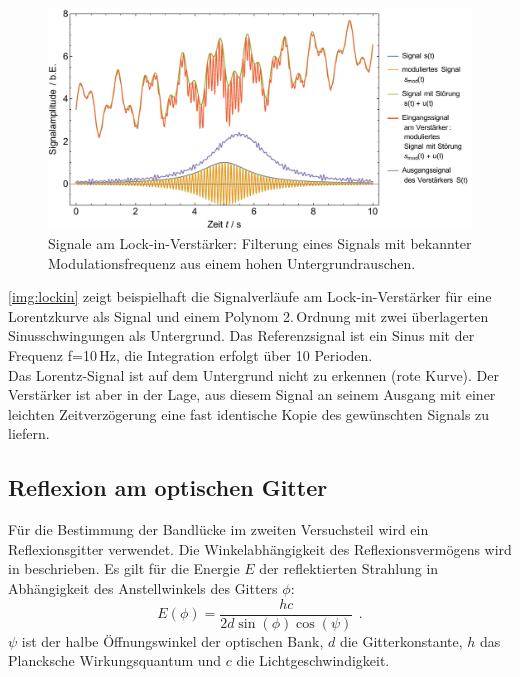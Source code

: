 \begin{figure}[H]
\begin{center}
  \includegraphics[width=\textwidth]{../img/lockin.pdf}
  \caption{Signale am Lock-in-Verstärker: Filterung eines Signals mit bekannter Modulationsfrequenz
  aus einem hohen Untergrundrauschen.}
  \label{img:lockin}
\end{center}
\end{figure}

\autoref{img:lockin} zeigt beispielhaft die Signalverläufe am Lock-in-Verstärker für
eine Lorentzkurve als Signal und einem Polynom 2.\,Ordnung mit zwei überlagerten Sinusschwingungen als Untergrund.
Das Referenzsignal ist ein Sinus mit der Frequenz f=10\,Hz, die Integration erfolgt über 10 Perioden.\\
Das Lorentz-Signal ist auf dem Untergrund nicht zu erkennen (rote Kurve).
Der Verstärker ist aber in der Lage, aus diesem Signal
an seinem Ausgang mit einer leichten Zeitverzögerung
eine fast identische Kopie des gewünschten Signals zu liefern.


\subsection{Reflexion am optischen Gitter}
Für die Bestimmung der Bandlücke im zweiten Versuchsteil wird ein Reflexionsgitter verwendet.
Die Winkelabhängigkeit des Reflexionsvermögens wird in \cite{staatsex} beschrieben. Es gilt
für die Energie $E$ der reflektierten Strahlung in Abhängigkeit des Anstellwinkels des Gitters $\phi$:
\begin{equation}
\label{eq:energy_angle}
E(\phi)=\frac{h c}{2 d \sin(\phi) \cos (\psi)} \ \, .
\end{equation}
$\psi$ ist der halbe Öffnungswinkel der optischen Bank, $d$ die Gitterkonstante,
$h$ das Plancksche Wirkungsquantum und $c$ die Lichtgeschwindigkeit.



